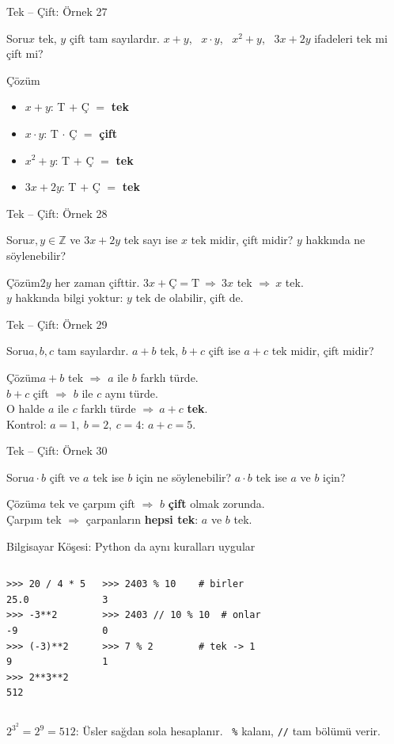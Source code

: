 \documentclass[aspectratio=169,11pt,handout]{beamer}
\newcommand{\soru}[3]{%
\begin{frame}{#1}
  \begin{block}{Soru}\large #2\end{block}
  \pause
  \begin{exampleblock}{Çözüm}\large #3\end{exampleblock}
\end{frame}}
\begin{document}
\soru{Tek -- Çift: Örnek 27}
{\(x\) tek, \(y\) çift tam sayılardır. \(x+y\), \ \(x\cdot y\), \ \(x^2+y\), \ \(3x+2y\) ifadeleri tek mi çift mi?}
{\begin{itemize}
\item \(x+y\): T \(+\) Ç \(=\) \textbf{tek}
\item \(x\cdot y\): T \(\cdot\) Ç \(=\) \textbf{çift}
\item \(x^2+y\): T \(+\) Ç \(=\) \textbf{tek}
\item \(3x+2y\): T \(+\) Ç \(=\) \textbf{tek}
\end{itemize}}

\soru{Tek -- Çift: Örnek 28}
{\(x,y\in\mathbb{Z}\) ve \(3x+2y\) tek sayı ise \(x\) tek midir, çift midir? \(y\) hakkında ne söylenebilir?}
{\(2y\) her zaman çifttir. \(3x+\text{Ç}=\text{T}\ \Rightarrow\ 3x\) tek \(\Rightarrow\ x\) tek.\\[3pt]
\(y\) hakkında bilgi yoktur: \(y\) tek de olabilir, çift de.}

\soru{Tek -- Çift: Örnek 29}
{\(a,b,c\) tam sayılardır. \(a+b\) tek, \(b+c\) çift ise \(a+c\) tek midir, çift midir?}
{\(a+b\) tek \(\Rightarrow\) \(a\) ile \(b\) farklı türde.\\
\(b+c\) çift \(\Rightarrow\) \(b\) ile \(c\) aynı türde.\\
O halde \(a\) ile \(c\) farklı türde \(\Rightarrow\ a+c\) \textbf{tek}.\\[3pt]
Kontrol: \(a=1,\ b=2,\ c=4\): \(a+c=5\).}

\soru{Tek -- Çift: Örnek 30}
{\(a\cdot b\) çift ve \(a\) tek ise \(b\) için ne söylenebilir? \(a\cdot b\) tek ise \(a\) ve \(b\) için?}
{\(a\) tek ve çarpım çift \(\Rightarrow\) \(b\) \textbf{çift} olmak zorunda.\\[3pt]
Çarpım tek \(\Rightarrow\) çarpanların \textbf{hepsi tek}: \(a\) ve \(b\) tek.}

\begin{frame}[fragile]{Bilgisayar Köşesi: Python da aynı kuralları uygular}
\begin{columns}[t]
\begin{verbatim}
>>> 20 / 4 * 5
25.0
>>> -3**2
-9
>>> (-3)**2
9
>>> 2**3**2
512
\end{verbatim}
\begin{verbatim}
>>> 2403 % 10    # birler
3
>>> 2403 // 10 % 10  # onlar
0
>>> 7 % 2        # tek -> 1
1
\end{verbatim}
\end{columns}
\small \(2^{3^2}=2^{9}=512\): Üsler sağdan sola hesaplanır. \ \verb|%| kalanı, \verb|//| tam bölümü verir.
\end{frame}
\end{document}
